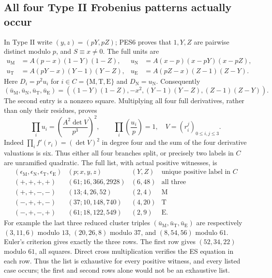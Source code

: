 \documentclass[11pt]{article}
\begin{document}
\subsection{All four Type II Frobenius patterns actually occur}
In Type II write $(y,z)=(pY,pZ)$; PES6 proves that $1,Y,Z$ are
pairwise distinct modulo $p$, and $S\equiv x\ne0$. The full units are
\[
\begin{aligned}
 u_{\mathrm M}&=A(p-x)(1-Y)(1-Z),&
 u_{\mathrm N}&=A(x-p)(x-pY)(x-pZ),\\
 u_{\mathrm T}&=A(pY-x)(Y-1)(Y-Z),&
 u_{\mathrm E}&=A(pZ-x)(Z-1)(Z-Y).
\end{aligned}                                                   \tag{SLF7}
\]
Here $D_i=p^2u_i$ for $i\in C=\{\mathrm M,\mathrm T,\mathrm E\}$
and $D_{\mathrm N}=u_{\mathrm N}$. Consequently
\[
 (\bar u_{\mathrm M},\bar u_{\mathrm N},
   \bar u_{\mathrm T},\bar u_{\mathrm E})
 =((1-Y)(1-Z),-x^2,(Y-1)(Y-Z),(Z-1)(Z-Y)).             \tag{SLF8}
\]
The second entry is a nonzero square. Multiplying all four full
derivatives, rather than only their residues, proves
\[
 \prod_i u_i
   =\left(\frac{A^2\det V}{p^3}\right)^2,\qquad
 \prod_i\left(\frac{u_i}p\right)=1,
 \quad V=(r_i^j)_{0\le i,j\le3}.                      \tag{SLF9}
\]
Indeed $\prod_i f'(r_i)=(\det V)^2$ in degree four and the sum
of the four derivative valuations is six. Thus either all four
branches split, or precisely two labels in $C$ are unramified
quadratic. The full list, with actual positive witnesses, is
\[
\begin{array}{c|c|c|c}
 (\epsilon_{\mathrm M},\epsilon_{\mathrm N},
  \epsilon_{\mathrm T},\epsilon_{\mathrm E})
 &(p;x,y,z)&(Y,Z)&\text{unique positive label in }C\\\hline
 (+,+,+,+)&(61;16,366,2928)&(6,48)&\text{all three}\\
 (+,+,-,-)&(13;4,26,52)&(2,4)&\mathrm M\\
 (-,+,+,-)&(37;10,148,740)&(4,20)&\mathrm T\\
 (-,+,-,+)&(61;18,122,549)&(2,9)&\mathrm E.
\end{array}                                                    \tag{SLF10}
\]
For example the last three reduced cluster triples
$(\bar u_{\mathrm M},\bar u_{\mathrm T},\bar u_{\mathrm E})$
are respectively $(3,11,6)$ modulo $13$, $(20,26,8)$ modulo $37$,
and $(8,54,56)$ modulo $61$. Euler's criterion gives exactly the
three rows. The first row gives $(52,34,22)$ modulo $61$, all
squares. Direct cross multiplication verifies the ES equation in
each row. Thus the list is exhaustive for every positive witness,
and every listed case occurs; the first and second rows alone
would not be an exhaustive list.
\end{document}
